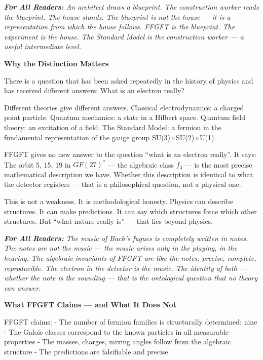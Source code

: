 \documentclass[11pt,oneside]{book}
\newenvironment{laierspur}{%
  \par\vspace{4pt}%
  \noindent\small\itshape\color{blue!60!black}%
  \textbf{For All Readers:}\enspace\ignorespaces}{%
  \par\vspace{4pt}\normalsize\normalfont\normalcolor}
\begin{document}
\begin{laierspur}
An architect draws a blueprint. The construction worker reads the
blueprint. The house stands. The blueprint is not the house — it is a
representation from which the house follows. FFGFT is the blueprint. The
experiment is the house. The Standard Model is the construction worker — a
useful intermediate level.
\end{laierspur}

\textbf{Why the Distinction Matters}

There is a question that has been asked repeatedly in the history of physics
and has received different answers: What is an electron really?

Different theories give different answers. Classical electrodynamics: a
charged point particle. Quantum mechanics: a state in a Hilbert space.
Quantum field theory: an excitation of a field. The Standard Model: a
fermion in the fundamental representation of the gauge group
SU(3)$\times$SU(2)$\times$U(1).

FFGFT gives no new answer to the question \enquote{what is an electron really}.
It says: The orbit {5, 15, 19} in $GF(27)^*$ — the algebraic class $f_3$ —
is the most precise mathematical description we have. Whether this
description is identical to what the detector registers — that is a
philosophical question, not a physical one.

This is not a weakness. It is methodological honesty. Physics can describe
structures. It can make predictions. It can say which structures force which
other structures. But \enquote{what nature really is} — that lies beyond physics.

\begin{laierspur}
The music of Bach's fugues is completely written in notes. The notes are
not the music — the music arises only in the playing, in the hearing. The
algebraic invariants of FFGFT are like the notes: precise, complete,
reproducible. The electron in the detector is the music. The identity of
both — whether the note is the sounding — that is the ontological question
that no theory can answer.
\end{laierspur}

\textbf{What FFGFT Claims — and What It Does Not}

FFGFT claims:
- The number of fermion families is structurally determined: nine
- The Galois classes correspond to the known particles in all measurable
  properties
- The masses, charges, mixing angles follow from the algebraic structure
- The predictions are falsifiable and precise
\end{document}
